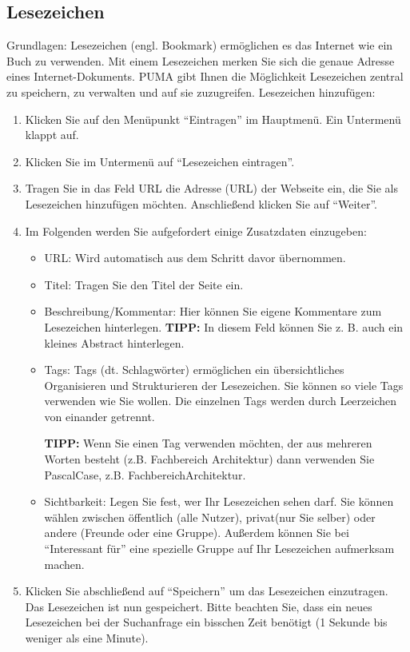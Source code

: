 \documentclass[b5paper,11pt,twoside]{scrbook} %
\begin{document}
\subsection{Lesezeichen} %
Grundlagen:
\newline
Lesezeichen (engl. Bookmark) ermöglichen es das Internet wie ein Buch zu verwenden. Mit einem Lesezeichen merken Sie sich die genaue Adresse eines Internet-Dokuments. PUMA gibt Ihnen die Möglichkeit Lesezeichen zentral zu speichern, zu verwalten und auf sie zuzugreifen. 
\newline
\newline
Lesezeichen hinzufügen:
\begin{enumerate}
    \item Klicken Sie auf den Menüpunkt \enquote{Eintragen} im Hauptmenü. Ein Untermenü klappt auf.
    \item Klicken Sie im Untermenü auf \enquote{Lesezeichen eintragen}.
    \item Tragen Sie in das Feld URL die Adresse (URL) der Webseite ein, die Sie als Lesezeichen hinzufügen möchten. Anschließend klicken Sie auf \enquote{Weiter}. 
    \item Im Folgenden werden Sie aufgefordert einige Zusatzdaten einzugeben:
    \begin{itemize}
        \item URL: Wird automatisch aus dem Schritt davor übernommen.
        \item Titel: Tragen Sie den Titel der Seite ein. %
        \item Beschreibung/Kommentar: Hier können Sie eigene Kommentare zum Lesezeichen hinterlegen. \textbf{TIPP:} In diesem Feld können Sie z. B. auch ein kleines Abstract hinterlegen. 
        \item Tags: Tags (dt. Schlagwörter) ermöglichen ein übersichtliches Organisieren und Strukturieren der Lesezeichen. Sie können so viele Tags verwenden wie Sie wollen. Die einzelnen Tags werden durch Leerzeichen von einander getrennt. \newline 
\begin{shaded}
\textbf{TIPP:} Wenn Sie einen Tag verwenden möchten, der aus mehreren Worten besteht (z.B. Fachbereich Architektur) dann verwenden Sie PascalCase, z.B. FachbereichArchitektur. 
\end{shaded}
        \item Sichtbarkeit: Legen Sie fest, wer Ihr Lesezeichen sehen darf. Sie können wählen zwischen öffentlich (alle Nutzer), privat(nur Sie selber) oder andere (Freunde oder eine Gruppe). Außerdem können Sie bei \enquote{Interessant für} eine spezielle Gruppe auf Ihr Lesezeichen aufmerksam machen.  
    \end{itemize}
    \item Klicken Sie abschließend auf \enquote{Speichern} um das Lesezeichen einzutragen. Das Lesezeichen ist nun gespeichert. Bitte beachten Sie, dass ein neues Lesezeichen bei der Suchanfrage ein bisschen Zeit benötigt (1 Sekunde bis weniger als eine Minute). 
\end{enumerate}
\end{document}
